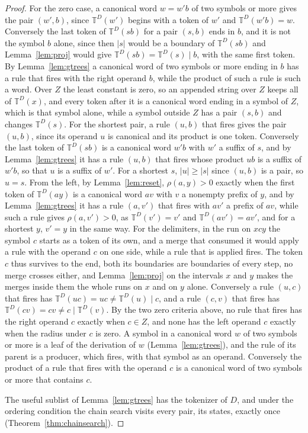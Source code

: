 \documentclass[11pt,a4paper]{article}
\theoremstyle{definition}
\theoremstyle{plain}
\newcommand{\T}{\mathbb{T}}
\begin{document}
\begin{proof}
For the zero case, a canonical word \(w = w'b\) of two symbols or more gives the pair \((w', b)\), since \(\T^D(w')\)
begins with a token of \(w'\) and \(\T^D(w'b) = w\). Conversely the last token of \(\T^D(sb)\) for a pair \((s, b)\)
ends in \(b\), and it is not the symbol \(b\) alone, since then \(|s|\) would be a boundary of \(\T^D(sb)\) and
Lemma~\ref{lem:proj} would give \(\T^D(sb) = \T^D(s) \mid b\), with the same first token. By Lemma~\ref{lem:gtrees} a
canonical word of two symbols or more ending in \(b\) has a rule that fires with the right operand \(b\), while the
product of such a rule is such a word. Over \(Z\) the least constant is zero, so an appended string over \(Z\) keeps all
of \(\T^D(x)\), and every token after it is a canonical word ending in a symbol of \(Z\), which is that symbol alone,
while a symbol outside \(Z\) has a pair \((s, b)\) and changes \(\T^D(s)\). For the shortest pair, a rule \((u, b)\)
that fires gives the pair \((u, b)\), since its operand \(u\) is canonical and its product is one token. Conversely the
last token of \(\T^D(sb)\) is a canonical word \(w'b\) with \(w'\) a suffix of \(s\), and by Lemma~\ref{lem:gtrees} it
has a rule \((u, b)\) that fires whose product \(ub\) is a suffix of \(w'b\), so that \(u\) is a suffix of \(w'\). For a
shortest \(s\), \(|u| \ge |s|\) since \((u, b)\) is a pair, so \(u = s\). From the left, by Lemma~\ref{lem:reset},
\(\rho(a, y) > 0\) exactly when the first token of \(\T^D(ay)\) is a canonical word \(av\) with \(v\) a nonempty prefix
of \(y\), and by Lemma~\ref{lem:gtrees} it has a rule \((a, v')\) that fires with \(av'\) a prefix of \(av\), while such
a rule gives \(\rho(a, v') > 0\), as \(\T^D(v') = v'\) and \(\T^D(av') = av'\), and for a shortest \(y\), \(v' = y\) in
the same way. For the delimiters, in the run on \(xcy\) the symbol \(c\) starts as a token of its own, and a merge that
consumed it would apply a rule with the operand \(c\) on one side, while a rule that is applied fires. The token \(c\)
thus survives to the end, both its boundaries are boundaries of every step, no merge crosses either, and
Lemma~\ref{lem:proj} on the intervals \(x\) and \(y\) makes the merges inside them the whole runs on \(x\) and on \(y\)
alone. Conversely a rule \((u, c)\) that fires has \(\T^D(uc) = uc \ne \T^D(u) \mid c\), and a rule \((c, v)\) that
fires has \(\T^D(cv) = cv \ne c \mid \T^D(v)\). By the two zero criteria above, no rule that fires has the right operand
\(c\) exactly when \(c \in Z\), and none has the left operand \(c\) exactly when the radius under \(c\) is zero. A
symbol in a canonical word \(w\) of two symbols or more is a leaf of the derivation of \(w\) (Lemma~\ref{lem:gtrees}),
and the rule of its parent is a producer, which fires, with that symbol as an operand. Conversely the product of a rule
that fires with the operand \(c\) is a canonical word of two symbols or more that contains \(c\).

The useful sublist of Lemma~\ref{lem:gtrees} has the tokenizer of \(D\), and under the ordering condition the chain
search visits every pair, its states, exactly once (Theorem~\ref{thm:chainsearch}).
\end{proof}
\end{document}
